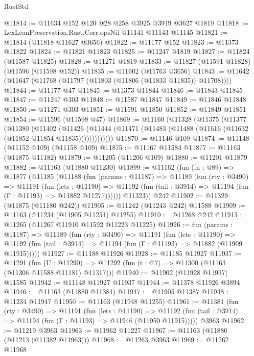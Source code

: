 \begin{lexlean}{RustStd}
\begin{coremodule}
@11814 := @11634 @152 @120 @28 @258 @3925 @3919 @3627 @1819
@11818 := LexLeanPreservation.Rust.Corr.opsNil @11141 @11143 @11145
@11821 := @11814 (@11818 @11627 @3656)
@11822 := @11177 @152
@11823 := @11373 @11822
@11824 := @11821 @11823
@11825 := @11247 @1819
@11827 := @11824 (@11587 @11825)
@11828 := @11271 @1819
@11833 := @11827 (@11591 @11828) (@11596 (@11598 @152))
@11835 := @11602 (@11763 @3656)
@11843 := @11642 (@11647 (@11768 (@11797 (@11803 (@11806 (@11833 @11835)) @11708))))
@11844 := @11177 @47
@11845 := @11373 @11844
@11846 := @11843 @11845
@11847 := @11247 @303
@11848 := @11587 @11847
@11849 := @11846 @11848
@11850 := @11271 @303
@11851 := @11591 @11850
@11852 := @11849 @11851
@11854 := @11596 (@11598 @47)
@11869 := @11160
    (@11328
      (@11375
        (@11377
          (@11380
            (@11402
              (@11426
                (@11444 (@11471 (@11483 (@11488 (@11616 (@11632 (@11852 @11854 @11835)))))))))))))
@11870 := @11146 @109
@11874 := @11148 (@11152 @109) (@11158 @109)
@11875 := @11167 @11584
@11877 := @11163 (@11875 @11182)
@11879 := @11205 (@11206 @109)
@11880 := @11201 @11879
@11882 := @11163 (@11880 @11230)
@11899 := @11162
    (fun (fn : @89) =>
    @11877
      (@11185
        (@11188
          (fun (params : @11187) =>
          @11189
            (fun (rty : @3490) =>
            @11191
              (fun (lets : @11190) =>
              @11192 (fun (tail : @3914) => @11194 (fun (Γ : @11193) => @11882 @11277))))))
        @11323))
    @242
@11902 := @11329 (@11875 (@11180 @242))
@11905 := @11242 (@11243 @242) @11588
@11909 := @11163 (@11234 (@11905 @11251) @11255)
@11910 := @11268 @242
@11915 := @11265 (@11267 @11910 @11592 @11223 @11225)
@11926 := fun (params : @11187) =>
  @11189
    (fun (rty : @3490) =>
    @11191
      (fun (lets : @11190) =>
      @11192 (fun (tail : @3914) => @11194 (fun (Γ : @11193) => @11882 (@11909 @11915)))))
@11927 := @11188 @11926
@11928 := @11185 @11927
@11937 := @11291
    (fun (U : @11290) => @11292 (fun (t : @7) => @11300 (@11163 (@11306 @11588 @11181) @11317)))
@11940 := @11902 (@11928 @11937) @11585
@11942 := @11148 @11927 @11937
@11944 := @11378 @11926 @3894
@11946 := @11163 (@11880 @11384)
@11947 := @11905 @11387
@11948 := @11234 @11947
@11950 := @11163 (@11948 @11255)
@11961 := @11381
    (fun (rty : @3490) =>
    @11191
      (fun (lets : @11190) =>
      @11192 (fun (tail : @3914) => @11194 (fun (Γ : @11193) => @11946 (@11950 @11915)))))
    @3963
@11962 := @11219 @3963
@11963 := @11962 @11227
@11967 := @11163 (@11880 (@11213 (@11382 @11963)))
@11968 := @11263 @3963
@11969 := @11262 @11968

\end{coremodule}
\end{lexlean}
